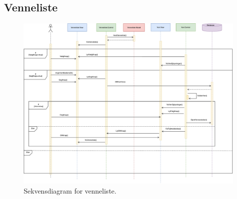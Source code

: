 \subsection*{Venneliste}

\begin{figure} [H]
\centering
\includegraphics[width=1\textwidth]{figures/Sek/SEKVenneliste}
\caption{Sekvensdiagram for venneliste.}
\label{fig:SEKVenneliste}
\end{figure}